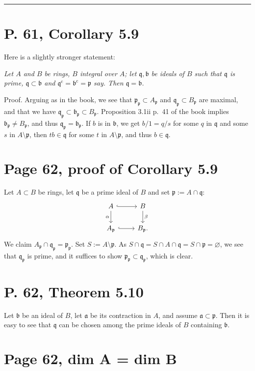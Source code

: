 \documentclass[parskip=half]{scrartcl}%
\newcommand{\oo}{\operatorname}
\newcommand{\mf}{\mathfrak}
\begin{document}
\hrule\bigskip

\section{P. 61, Corollary 5.9}\label{59}%

Here is a slightly stronger statement: 

\emph{Let $A$ and $B$ be rings, $B$ integral over $A$; let $\mf q,\mf b$ be ideals of $B$ such that $\mf q$ is prime, $\mf q\subset\mf b$ and $\mf q^{\oo c}=\mf b^{\oo c}=\mf p$ say. Then $\mf q=\mf b$.}

Proof. Arguing as in the book, we see that $\mf p_{\mf p}\subset A_{\mf p}$ and $\mf q_{\mf p}\subset B_{\mf p}$ are maximal, and that we have $\mf q_{\mf p}\subset\mf b_{\mf p}\subset B_{\mf p}$. Proposition 3.1ii p.~41 of the book implies $\mf b_{\mf p}\ne B_{\mf p}$, and thus $\mf q_{\mf p}=\mf b_{\mf p}$. If $b$ is in $\mf b$, we get $b/1=q/s$ for some $q$ in $\mf q$ and some $s$ in $A\setminus\mf p$, then $tb\in\mf q$ for some $t$ in $A\setminus\mf p$, and thus $b\in\mf q$.

\section{Page 62, proof of Corollary 5.9}%

Let $A\subset B$ be rings, let $\mf q$ be a prime ideal of $B$ and set $\mf p:=A\cap\mf q$:
$$
\begin{tikzcd}
A\ar[d,"\alpha"']\ar[r,hook]&B\ar[d,"\beta"]\\ 
A_{\mf p}\ar[r,hook]&B_{\mf p}.
\end{tikzcd}
$$
We claim $A_{\mf p}\cap\mf q_{\mf p}=\mf p_{\mf p}$. Set $S:=A\setminus\mf p$. As $S\cap\mf q=S\cap A\cap\mf q=S\cap\mf p=\varnothing$, we see that $\mf q_{\mf p}$ is prime, and it suffices to show $\mf p_{\mf p}\subset\mf q_{\mf p}$, which is clear.

\section{P. 62, Theorem 5.10}%

Let $\mf b$ be an ideal of $B$, let $\mf a$ be its contraction in $A$, and assume $\mf a\subset\mf p$. Then it is easy to see that $\mf q$ can be chosen among the prime ideals of $B$ containing $\mf b$.

\section{Page 62, dim A = dim B}%
\end{document}
